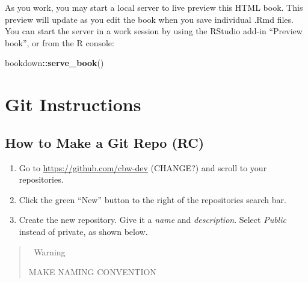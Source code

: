 \documentclass[
]{book}
\newenvironment{Shaded}{\begin{snugshade}}{\end{snugshade}}
\newcommand{\FunctionTok}[1]{\textcolor[rgb]{0.13,0.29,0.53}{\textbf{#1}}}
\newcommand{\NormalTok}[1]{#1}
\newcommand{\SpecialCharTok}[1]{\textcolor[rgb]{0.81,0.36,0.00}{\textbf{#1}}}
\theoremstyle{definition}
\theoremstyle{definition}
\theoremstyle{definition}
\theoremstyle{definition}
\theoremstyle{remark}
\begin{document}
As you work, you may start a local server to live preview this HTML book. This preview will update as you edit the book when you save individual .Rmd files. You can start the server in a work session by using the RStudio add-in ``Preview book'', or from the R console:

\begin{Shaded}
\begin{Highlighting}[]
\NormalTok{bookdown}\SpecialCharTok{::}\FunctionTok{serve\_book}\NormalTok{()}
\end{Highlighting}
\end{Shaded}

\chapter{Git Instructions}\label{git-instructions}

\section{How to Make a Git Repo (RC)}\label{how-to-make-a-git-repo-rc}

\begin{enumerate}
\def\labelenumi{\arabic{enumi}.}
\item
  Go to \url{https://github.com/cbw-dev} (CHANGE?) and scroll to your repositories.
\item
  Click the green ``New'' button to the right of the repositories search bar.
\item
  Create the new repository. Give it a \emph{name} and \emph{description}. Select \emph{Public} instead of private, as shown below.
\end{enumerate}

\begin{quote}
🚧 Warning

MAKE NAMING CONVENTION
\end{quote}
\end{document}
